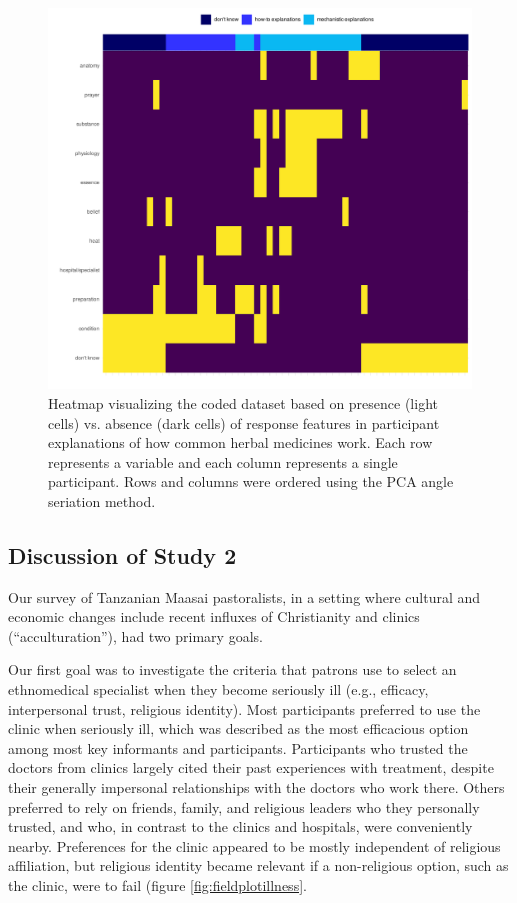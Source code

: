 \documentclass[
  11pt,
]{article}
\begin{document}
\begin{figure}[p]

{\centering \includegraphics{magic-healers-article2_files/figure-latex/fieldplotCausalExp-1} 

}

\caption{Heatmap visualizing the coded dataset based on presence (light cells) vs. absence (dark cells) of response features in participant explanations of how common herbal medicines work. Each row represents a variable and each column represents a single participant. Rows and columns were ordered using the PCA angle seriation method.}\label{fig:fieldplotCausalExp}
\end{figure}

\hypertarget{discussion-of-study-2}{%
\subsection{Discussion of Study 2}\label{discussion-of-study-2}}

Our survey of Tanzanian Maasai pastoralists, in a setting where cultural and economic changes include recent influxes of Christianity and clinics (``acculturation''), had two primary goals.

Our first goal was to investigate the criteria that patrons use to select an ethnomedical specialist when they become seriously ill (e.g., efficacy, interpersonal trust, religious identity). Most participants preferred to use the clinic when seriously ill, which was described as the most efficacious option among most key informants and participants. Participants who trusted the doctors from clinics largely cited their past experiences with treatment, despite their generally impersonal relationships with the doctors who work there. Others preferred to rely on friends, family, and religious leaders who they personally trusted, and who, in contrast to the clinics and hospitals, were conveniently nearby. Preferences for the clinic appeared to be mostly independent of religious affiliation, but religious identity became relevant if a non-religious option, such as the clinic, were to fail (figure \ref{fig:fieldplotillness}.
\end{document}
